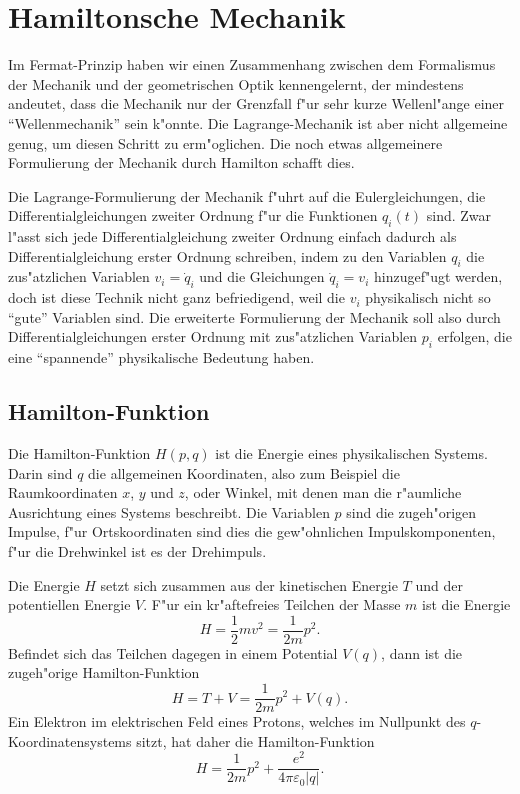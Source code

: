 \section{Hamiltonsche Mechanik}
Im Fermat-Prinzip haben wir einen Zusammenhang zwischen dem Formalismus
der Mechanik und der geometrischen Optik kennengelernt, der mindestens
andeutet, dass die Mechanik nur der Grenzfall f"ur sehr kurze Wellenl"ange
einer ``Wellenmechanik'' sein k"onnte.
Die Lagrange-Mechanik ist aber nicht allgemeine genug, um diesen
Schritt zu erm"oglichen.
Die noch etwas allgemeinere Formulierung der Mechanik durch Hamilton
schafft dies.

Die Lagrange-Formulierung der Mechanik f"uhrt auf die Eulergleichungen,
die Differentialgleichungen zweiter Ordnung f"ur die Funktionen $q_i(t)$ 
sind.
Zwar l"asst sich jede Differentialgleichung zweiter Ordnung einfach
dadurch als Differentialgleichung erster Ordnung schreiben, indem
zu den Variablen $q_i$ die zus"atzlichen Variablen $v_i=\dot q_i$ und die
Gleichungen $\dot q_i=v_i$ hinzugef"ugt werden, doch ist diese Technik
nicht ganz befriedigend, weil die $v_i$ physikalisch nicht so ``gute''
Variablen sind.
Die erweiterte Formulierung der Mechanik soll also durch
Differentialgleichungen erster Ordnung mit zus"atzlichen
Variablen $p_i$ erfolgen, die eine ``spannende'' physikalische
Bedeutung haben.

\subsection{Hamilton-Funktion}
Die Hamilton-Funktion $H(p,q)$ ist die Energie eines physikalischen
Systems. Darin sind $q$ die allgemeinen Koordinaten, also
zum Beispiel die Raumkoordinaten $x$, $y$ und $z$, oder Winkel, mit
denen man die r"aumliche Ausrichtung eines Systems beschreibt.
Die Variablen $p$ sind die zugeh"origen Impulse, f"ur Ortskoordinaten
sind dies die gew"ohnlichen Impulskomponenten, f"ur die Drehwinkel ist
es der Drehimpuls.

Die Energie $H$ setzt sich zusammen aus der kinetischen Energie $T$ und der
potentiellen Energie $V$. F"ur ein kr"aftefreies Teilchen der Masse $m$
ist die Energie 
\[
H=\frac12mv^2=\frac1{2m}p^2.
\]
Befindet sich das Teilchen dagegen in einem Potential $V(q)$, dann 
ist die zugeh"orige Hamilton-Funktion
\begin{equation}
H=T+V=\frac1{2m}p^2+V(q).
\label{skript:hamilton-potential}
\end{equation}
Ein Elektron im elektrischen Feld eines Protons, welches im Nullpunkt
des $q$-Koordinatensystems sitzt, hat daher die Hamilton-Funktion
\[
H=\frac1{2m}p^2+\frac{e^2}{4\pi\varepsilon_0|q|}.
\]

